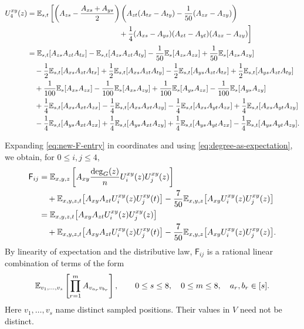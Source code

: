 \begin{align}
U_4^{xy}(z)
&=\E_{s,t}\left[
\left(A_{zs}-\frac{A_{xs}+A_{ys}}2\right)
\left(A_{zt}(A_{tx}-A_{ty})-\frac1{50}(A_{zx}-A_{zy})\right)
\right.\notag\\
&\hspace{43mm}\left.
{}+\frac14(A_{xs}-A_{ys})(A_{xt}-A_{yt})(A_{zx}-A_{zy})
\right]\notag\\
&=\E_{s,t}[A_{zs}A_{zt}A_{tx}]-\E_{s,t}[A_{zs}A_{zt}A_{ty}]
  -\frac1{50}\E_s[A_{zs}A_{zx}]+\frac1{50}\E_s[A_{zs}A_{zy}]
\notag\\
&\quad-\frac12\E_{s,t}[A_{xs}A_{zt}A_{tx}]
  +\frac12\E_{s,t}[A_{xs}A_{zt}A_{ty}]
  -\frac12\E_{s,t}[A_{ys}A_{zt}A_{tx}]
  +\frac12\E_{s,t}[A_{ys}A_{zt}A_{ty}]\notag\\
&\quad+\frac1{100}\E_s[A_{xs}A_{zx}]
  -\frac1{100}\E_s[A_{xs}A_{zy}]
  +\frac1{100}\E_s[A_{ys}A_{zx}]
  -\frac1{100}\E_s[A_{ys}A_{zy}]\notag\\
&\quad+\frac14\E_{s,t}[A_{xs}A_{xt}A_{zx}]
  -\frac14\E_{s,t}[A_{xs}A_{xt}A_{zy}]
  -\frac14\E_{s,t}[A_{xs}A_{yt}A_{zx}]
  +\frac14\E_{s,t}[A_{xs}A_{yt}A_{zy}]\notag\\
&\quad-\frac14\E_{s,t}[A_{ys}A_{xt}A_{zx}]
  +\frac14\E_{s,t}[A_{ys}A_{xt}A_{zy}]
  +\frac14\E_{s,t}[A_{ys}A_{yt}A_{zx}]
  -\frac14\E_{s,t}[A_{ys}A_{yt}A_{zy}].
\label{eq:U4-expectation}
\end{align}

Expanding \eqref{eq:new-F-entry} in coordinates and using
\eqref{eq:degree-as-expectation}, we obtain, for $0\leq i,j\leq4$,
\begin{align}
\mathsf F_{ij}
&=\mathbb E_{x,y,z}\left[A_{xy}\frac{\deg_G(z)}n
U_i^{xy}(z)U_j^{xy}(z)\right]\notag\\
&\quad+\mathbb E_{x,y,z,t}\big[A_{xy}A_{zt}U_i^{xy}(z)U_j^{xy}(t)\big]
-\frac7{50}\mathbb E_{x,y,z}\big[A_{xy}U_i^{xy}(z)U_j^{xy}(z)\big]
\notag\\
&=\mathbb E_{x,y,z,t}\big[A_{xy}A_{zt}U_i^{xy}(z)U_j^{xy}(z)\big]
\notag\\
&\quad+\mathbb E_{x,y,z,t}\big[A_{xy}A_{zt}U_i^{xy}(z)U_j^{xy}(t)\big]
-\frac7{50}\mathbb E_{x,y,z}\big[A_{xy}U_i^{xy}(z)U_j^{xy}(z)\big].
\label{eq:F-expectation-expansion}
\end{align}
By linearity of expectation and the distributive law,
$\mathsf F_{ij}$ is a rational linear combination of
terms of the form
\begin{equation}\label{eq:averaged-adjacency-monomial}
\mathbb E_{v_1,\ldots,v_s}
\left[\prod_{r=1}^m A_{v_{a_r}v_{b_r}}\right],
\qquad 0\leq s\leq8,\quad 0\leq m\leq8,
\quad a_r,b_r\in[s].
\end{equation}
Here $v_1,\ldots,v_s$ name distinct sampled positions.
Their values in $V$ need not be distinct.

